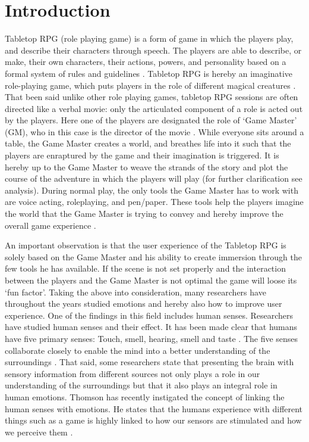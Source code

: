 \chapter{Introduction} 
Tabletop RPG (role playing game) is a form of game in which the players play, and describe their characters 
through speech. The players are able to describe, or make, their own characters, their actions, powers, and 
personality based on a formal system of rules and guidelines \cite{JohnFKim}. Tabletop RPG is hereby an 
imaginative role-playing game, which puts players in the role of different magical creatures \cite{Banks}.
That been said unlike other role playing games, tabletop RPG sessions are often directed like a verbal movie: only the articulated component of a role is acted out by the players. Here one of the players are designated the role of ‘Game Master’ (GM), who in this case is the director of the movie \cite{JohnFKim}. While everyone sits around a table, the Game Master creates a world, and breathes life into it such that the players are enraptured by the game and their imagination is triggered\cite{Banks}. It is hereby up to the Game Master to weave the strands of the story and plot the course of the adventure in which the players will play (for further clarification see analysis).
During normal play, the only tools the Game Master has to work with are voice acting, roleplaying, and pen/paper. These tools help the players imagine the world that the Game Master is trying to convey and hereby improve the overall game experience \cite{Banks}.  

An important observation is that the user experience of the Tabletop RPG is solely based on the Game Master and his ability to create immersion through the few tools he has available. If the scene is not set properly and the interaction between the players and the Game Master is not optimal the game will loose its ‘fun factor’. 
Taking the above into consideration, many researchers have throughout the years studied emotions and hereby also how to improve user experience. One of the findings in this field includes human senses. 
Researchers have studied human senses and their effect. It has been made clear that humans have five primary senses: Touch, smell, hearing, smell and taste \cite{MZanker}.  The five senses collaborate closely to enable the mind into a better understanding of the surroundings \cite{Groeger}. 
That said, some researchers state that presenting the brain with sensory information from different sources not only plays a role in our understanding of the surroundings but that it also plays an integral role in human emotions. Thomson has recently instigated the concept of linking the human senses with emotions. He states that the humans experience with different things such as a game is highly linked to how our sensors are stimulated and how we perceive them \cite{J.Thomson}. 

